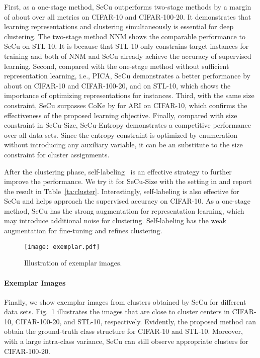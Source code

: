 \documentclass[10pt,twocolumn,letterpaper]{article}
\begin{document}
First, as a one-stage method, SeCu outperforms two-stage methods by a margin of about  over all metrics on CIFAR-10 and CIFAR-100-20. It demonstrates that learning representations and clustering simultaneously is essential for deep clustering. The two-stage method NNM\cite{DangD0WH21} shows the comparable performance to SeCu on STL-10. It is because that STL-10 only constrains  target instances for training and both of NNM and SeCu already achieve the accuracy of supervised learning. Second, compared with the one-stage method without sufficient representation learning, i.e., PICA, SeCu demonstrates a better performance by about  on CIFAR-10 and CIFAR-100-20, and  on STL-10, which shows the importance of optimizing representations for instances. Third, with the same size constraint, SeCu surpasses CoKe by  for ARI on CIFAR-10, which confirms the effectiveness of the proposed learning objective. Finally, compared with size constraint in SeCu-Size, SeCu-Entropy demonstrates a competitive performance over all data sets. Since the entropy constraint is optimized by enumeration without introducing any auxiliary variable, it can be an substitute to the size constraint for cluster assignments. 


After the clustering phase, self-labeling~\cite{GansbekeVGPG20} is an effective strategy to further improve the performance. We try it for SeCu-Size with the setting in \cite{GansbekeVGPG20} and report the result in Table~\ref{ta:cluster}. Interestingly, self-labeling is also effective for SeCu and helps approach the supervised accuracy on CIFAR-10. As a one-stage method, SeCu has the strong augmentation for representation learning, which may introduce additional noise for clustering. Self-labeling has the weak augmentation for fine-tuning and refines clustering. 

\begin{figure}[!ht]
\centering
\texttt{[image: exemplar.pdf]}
\caption{Illustration of exemplar images.}\label{fig:exemplar}
\end{figure}

\paragraph{Exemplar Images}
Finally, we show exemplar images from clusters obtained by SeCu for different data sets. Fig.~\ref{fig:exemplar} illustrates the images that are close to cluster centers in CIFAR-10, CIFAR-100-20, and STL-10, respectively. Evidently, the proposed method can obtain the ground-truth class structure for CIFAR-10 and STL-10. Moreover, with a large intra-class variance, SeCu can still observe appropriate clusters for CIFAR-100-20.
\end{document}
